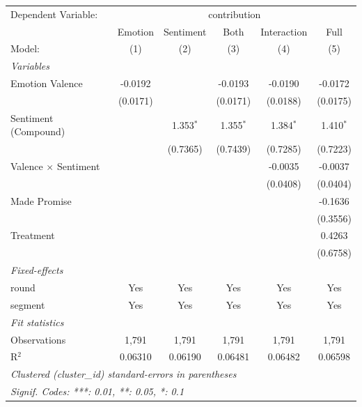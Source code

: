 
\begingroup
\centering
\begin{tabular}{lccccc}
   \tabularnewline \midrule \midrule
   Dependent Variable: & \multicolumn{5}{c}{contribution}\\
                               & Emotion  & Sentiment   & Both        & Interaction & Full \\   
   Model:                      & (1)      & (2)         & (3)         & (4)         & (5)\\  
   \midrule
   \emph{Variables}\\
   Emotion Valence             & -0.0192  &             & -0.0193     & -0.0190     & -0.0172\\   
                               & (0.0171) &             & (0.0171)    & (0.0188)    & (0.0175)\\   
   Sentiment (Compound)        &          & 1.353$^{*}$ & 1.355$^{*}$ & 1.384$^{*}$ & 1.410$^{*}$\\   
                               &          & (0.7365)    & (0.7439)    & (0.7285)    & (0.7223)\\   
   Valence $\times$ Sentiment  &          &             &             & -0.0035     & -0.0037\\   
                               &          &             &             & (0.0408)    & (0.0404)\\   
   Made Promise                &          &             &             &             & -0.1636\\   
                               &          &             &             &             & (0.3556)\\   
   Treatment                   &          &             &             &             & 0.4263\\   
                               &          &             &             &             & (0.6758)\\   
   \midrule
   \emph{Fixed-effects}\\
   round                       & Yes      & Yes         & Yes         & Yes         & Yes\\  
   segment                     & Yes      & Yes         & Yes         & Yes         & Yes\\  
   \midrule
   \emph{Fit statistics}\\
   Observations                & 1,791    & 1,791       & 1,791       & 1,791       & 1,791\\  
   R$^2$                       & 0.06310  & 0.06190     & 0.06481     & 0.06482     & 0.06598\\  
   \midrule \midrule
   \multicolumn{6}{l}{\emph{Clustered (cluster\_id) standard-errors in parentheses}}\\
   \multicolumn{6}{l}{\emph{Signif. Codes: ***: 0.01, **: 0.05, *: 0.1}}\\
\end{tabular}
\par\endgroup


